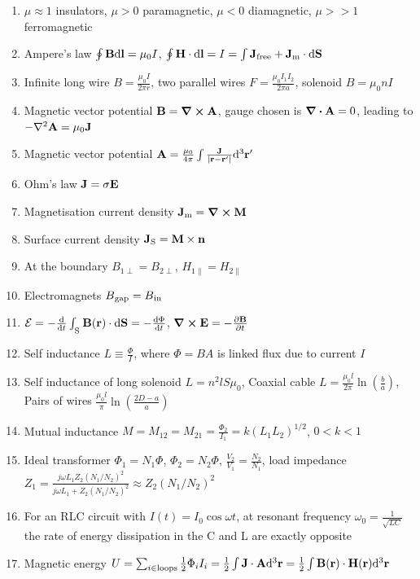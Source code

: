 \documentclass{article}
\theoremstyle{remark}
\theoremstyle{remark}
\newcommand{\s}[1]{\textsubscript{#1}}
\begin{document}
\begin{enumerate}
    \item $\mu\approx 1$ insulators, $\mu>0$ paramagnetic, $\mu<0$ diamagnetic, $\mu>>1$ ferromagnetic
    \item Ampere's law $\oint\vb{B}\dd\vb{l} = \mu_0 I$, $\oint\vb{H}\cdot\dd\vb{l}=I = \int\vb{J\s{free}}+\vb{J\s{m}}\cdot\dd\vb{S}$
    \item Infinite long wire $B=\frac{\mu_0 I}{2\pi r}$, two parallel wires $F=\frac{\mu_0 I_1 I_2}{2\pi a}$, solenoid $B=\mu_0 n I$
    \item Magnetic vector potential $\vb{B} = \curl\vb{A}$, gauge chosen is $\div\vb{A}=0$, leading to $-\laplacian\vb{A}=\mu_0\vb{J}$
    \item Magnetic vector potential $\vb{A}=\frac{\mu_0}{4\pi}\int\frac{\vb{J}}{|\vb{r}-\vb{r}'|}\dd^3\vb{r}'$
    \item Ohm's law $\vb{J} = \sigma\vb{E}$
    \item Magnetisation current density $\vb{J}\s{m} = \curl\vb{M}$
    \item Surface current density $\vb{J}\s S = \vb{M}\times\vb{n}$
    \item At the boundary $B_{1\perp}=B_{2\perp}$, $H_{1\parallel}=H_{2\parallel}$
    \item Electromagnets $B\s{gap}=B\s{in}$
    \item $\mathcal{E}=-\dv{t}\int_{\s S}\vb{B}(\vb{r})\cdot\dd\vb{S}=-\dv{\Phi}{t}$, $\curl\vb{E}=-\pdv{\vb{B}}{t}$
    \item Self inductance $\boxed{L\equiv\frac{\Phi}{I}}$, where $\Phi=BA$ is linked flux due to current $I$
    \item Self inductance of long solenoid $L=n^2 lS\mu_0$, Coaxial cable $L=\frac{\mu_0 l}{2\pi}\ln\left(\frac{b}{a}\right)$, Pairs of wires $\frac{\mu_0 l}{\pi}\ln\left(\frac{2D-a}{a}\right)$
    \item Mutual inductance $M = M_{12}=M_{21}=\frac{\Phi_2}{I_1} = k(L_1 L_2)^{1/2}$, $0<k<1$
    \item Ideal transformer $\Phi_1=N_1\Phi$, $\Phi_2=N_2\Phi$, $\frac{V_2}{V_1}=\frac{N_2}{N_1}$, load impedance $Z_1=\frac{j\omega L_1Z_2(N_1/N_2)^2}{j\omega L_1+Z_2(N_1/N_2)^2}\approx Z_2(N_1/N_2)^2$
    \item For an RLC circuit with $I(t)=I_0\cos\omega t$, at resonant frequency $\omega_0=\frac{1}{\sqrt{LC}}$ the rate of energy dissipation in the C and L are exactly opposite
    \item Magnetic energy $U=\sum_{i\in\text{loops}}\frac{1}{2}\Phi_i I_i = \frac{1}{2}\int\vb{J}\cdot\vb{A}\dd^3\vb{r} = \frac{1}{2}\int\vb{B}(\vb{r})\cdot\vb{H}(\vb{r})\dd^3\vb{r}$

\end{enumerate}
\end{document}
